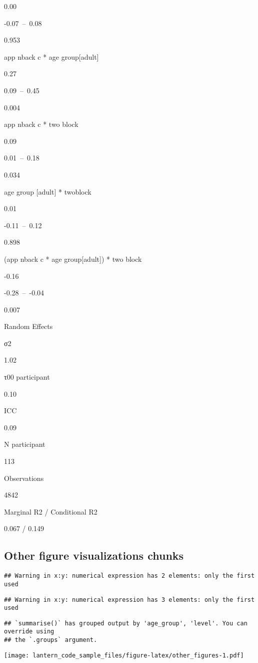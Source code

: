 \documentclass[
]{article}
\begin{document}
0.00

-0.07~--~0.08

0.953

app nback c * age group{[}adult{]}

0.27

0.09~--~0.45

0.004

app nback c * two block

0.09

0.01~--~0.18

0.034

age group {[}adult{]} * twoblock

0.01

-0.11~--~0.12

0.898

(app nback c * age group{[}adult{]}) * two block

-0.16

-0.28~--~-0.04

0.007

Random Effects

σ2

1.02

τ00 participant

0.10

ICC

0.09

N participant

113

Observations

4842

Marginal R2 / Conditional R2

0.067 / 0.149

\hypertarget{other-figure-visualizations-chunks}{%
\subsection{Other figure visualizations
chunks}\label{other-figure-visualizations-chunks}}

\begin{verbatim}
## Warning in x:y: numerical expression has 2 elements: only the first used
\end{verbatim}

\begin{verbatim}
## Warning in x:y: numerical expression has 3 elements: only the first used
\end{verbatim}

\begin{verbatim}
## `summarise()` has grouped output by 'age_group', 'level'. You can override using
## the `.groups` argument.
\end{verbatim}

\texttt{[image: lantern\_code\_sample\_files/figure-latex/other\_figures-1.pdf]}
\end{document}
